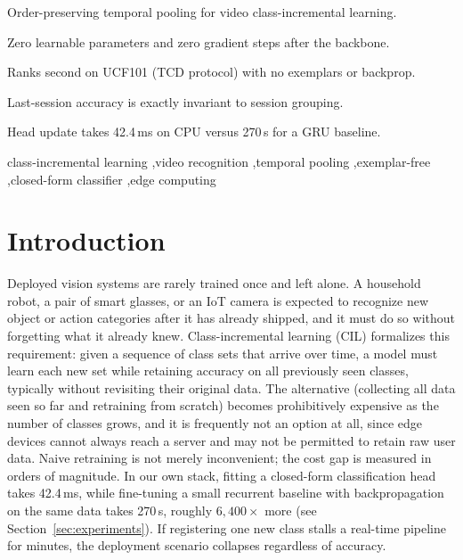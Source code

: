 \documentclass[a4paper,fleqn]{cas-dc}
\begin{document}
\begin{highlights}
\item Order-preserving temporal pooling for video class-incremental learning.
\item Zero learnable parameters and zero gradient steps after the backbone.
\item Ranks second on UCF101 (TCD protocol) with no exemplars or backprop.
\item Last-session accuracy is exactly invariant to session grouping.
\item Head update takes 42.4\,ms on CPU versus 270\,s for a GRU baseline.
\end{highlights}

\begin{keywords}
class-incremental learning \sep video recognition \sep temporal pooling
\sep exemplar-free \sep closed-form classifier \sep edge computing
\end{keywords}

\maketitle



\section{Introduction}
\label{sec:intro}

Deployed vision systems are rarely trained once and left alone. A household
robot, a pair of smart glasses, or an IoT camera is expected to recognize new
object or action categories after it has already shipped, and it must do so
without forgetting what it already knew. Class-incremental learning (CIL)
formalizes this requirement: given a sequence of class sets that arrive over
time, a model must learn each new set while retaining accuracy on all
previously seen classes, typically without revisiting their original data.
The alternative (collecting all data seen so far and retraining from
scratch) becomes prohibitively expensive as the number of classes grows,
and it is frequently not an option at all, since edge devices cannot always
reach a server and may not be permitted to retain raw user data. Naive
retraining is not merely inconvenient; the cost gap is measured in orders of
magnitude. In our own stack, fitting a closed-form classification head takes
42.4\,ms, while fine-tuning a small recurrent baseline with backpropagation
on the same data takes 270\,s, roughly $6{,}400\times$ more (see
Section~\ref{sec:experiments}). If registering one new class stalls a
real-time pipeline for minutes, the deployment scenario collapses regardless
of accuracy.
\end{document}
